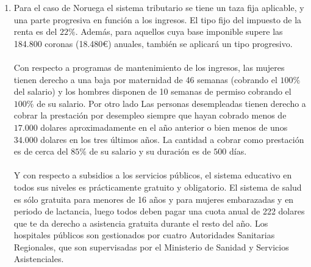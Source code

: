 \begin{enumerate}[\bfseries 1.]
    \item  Para el caso de Noruega el sistema tributario se tiene un taza fija aplicable, y una parte progresiva en función a los ingresos. El tipo fijo del impuesto de la renta es del $22\%$. Además, para aquellos cuya base imponible supere las 184.800 coronas (18.480€) anuales, también se aplicará un tipo progresivo.\\\\
    Con respecto a programas de mantenimiento de los ingresos, las mujeres tienen derecho a una baja por maternidad de 46 semanas (cobrando el $100\%$ del salario) y los hombres disponen de 10 semanas de permiso cobrando el $100\%$ de su salario. Por otro lado Las personas desempleadas tienen derecho a cobrar la prestación por desempleo siempre que hayan cobrado menos de $17.000$ dolares aproximadamente en el año anterior o bien menos de unos 34.000 dolares en los tres últimos años. La cantidad a cobrar como prestación es de cerca del $85\%$ de su salario y su duración es de $500$ días.\\\\

    Y con respecto a subsidios a los servicios públicos, el sistema educativo en todos sus niveles es prácticamente gratuito y obligatorio. El sistema de salud es sólo gratuita para menores de 16 años y para mujeres embarazadas y en periodo de lactancia, luego todos deben pagar una cuota anual de 222 dolares que te da derecho a asistencia gratuita durante el resto del año. Los hospitales públicos son gestionados por cuatro Autoridades Sanitarias Regionales, que son supervisadas por el Ministerio de Sanidad y Servicios Asistenciales.




\end{enumerate}

